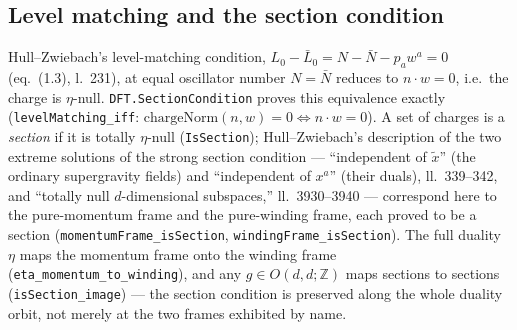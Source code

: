 \documentclass[11pt,a4paper]{article}
\theoremstyle{remark}
\begin{document}
\subsection{Level matching and the section condition}
Hull--Zwiebach's level-matching condition, $L_0-\bar L_0=N-\bar N-p_a w^a=0$ (eq.~(1.3), l.~231),
at equal oscillator number $N=\bar N$ reduces to $n\cdot w=0$, i.e.\ the charge is $\eta$-null.
\texttt{DFT.SectionCondition} proves this equivalence exactly
(\texttt{levelMatching\_iff}: $\mathrm{chargeNorm}(n,w)=0 \iff n\cdot w=0$). A set of charges is a
\emph{section} if it is totally $\eta$-null (\texttt{IsSection}); Hull--Zwiebach's description of
the two extreme solutions of the strong section condition --- ``independent of $\tilde x$'' (the
ordinary supergravity fields) and ``independent of $x^a$'' (their duals), ll.~339--342, and
``totally null $d$-dimensional subspaces,'' ll.~3930--3940 --- correspond here to the pure-momentum
frame and the pure-winding frame, each proved to be a section
(\texttt{momentumFrame\_isSection}, \texttt{windingFrame\_isSection}). The full duality $\eta$ maps
the momentum frame onto the winding frame (\texttt{eta\_momentum\_to\_winding}), and any
$g\in O(d,d;\mathbb{Z})$ maps sections to sections (\texttt{isSection\_image}) --- the section
condition is preserved along the whole duality orbit, not merely at the two frames exhibited by
name.
\end{document}
